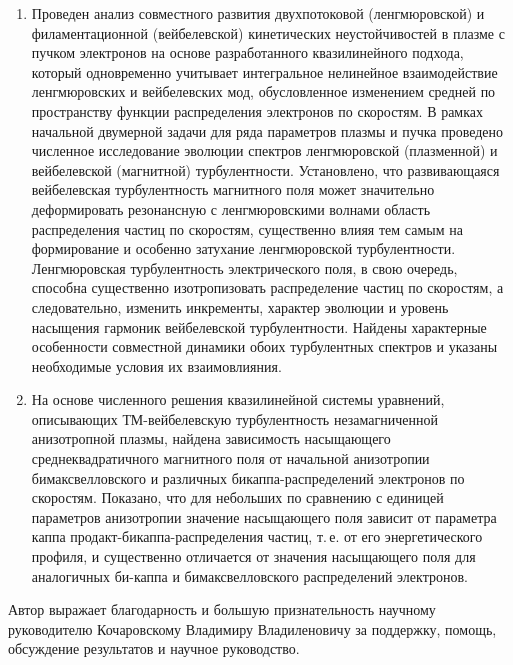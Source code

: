 \begin{enumerate}
    \item  Проведен анализ совместного развития двухпотоковой (ленгмюровской) и филаментационной (вейбелевской) кинетических неустойчивостей в плазме с пучком электронов на основе разработанного квазилинейного подхода, который одновременно учитывает интегральное нелинейное взаимодействие ленгмюровских и вейбелевских мод, обусловленное изменением средней по пространству функции распределения электронов по скоростям. 
    В рамках начальной двумерной задачи для ряда параметров плазмы и пучка проведено численное исследование эволюции спектров ленгмюровской (плазменной) и вейбелевской (магнитной) турбулентности. Установлено, что развивающаяся вейбелевская турбулентность магнитного поля может значительно деформировать резонансную с ленгмюровскими волнами область распределения частиц по скоростям, существенно влияя тем самым на формирование и особенно затухание ленгмюровской турбулентности. Ленгмюровская турбулентность электрического поля, в свою очередь, способна существенно изотропизовать распределение частиц по скоростям, а следовательно, изменить инкременты, характер эволюции и уровень насыщения гармоник вейбелевской турбулентности. Найдены характерные особенности совместной динамики обоих турбулентных спектров и указаны необходимые условия их взаимовлияния.

    \item  На основе численного решения квазилинейной системы уравнений, описывающих ТМ-вейбелевскую турбулентность незамагниченной анизотропной плазмы, найдена зависимость насыщающего среднеквадратичного магнитного поля от начальной анизотропии бимаксвелловского и различных бикаппа{\PunctumKappa}-распределений электронов по скоростям. Показано, что для небольших по сравнению с единицей параметров анизотропии значение насыщающего поля зависит от параметра каппа продакт-бикаппа{\PunctumKappa}-распределения частиц, т.\,е. от его энергетического профиля, и существенно отличается от значения насыщающего поля для аналогичных би-каппа и бимаксвелловского распределений электронов.

\end{enumerate}

Автор выражает благодарность и большую признательность научному руководителю Кочаровскому Владимиру Владиленовичу за поддержку, помощь, обсуждение результатов и научное руководство.

